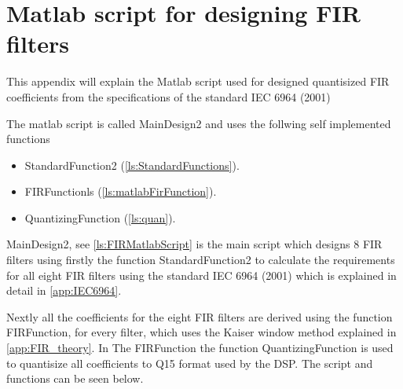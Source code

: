 \chapter{Matlab script for designing FIR filters} \label{app:FIR_Matlab}
This appendix will explain the Matlab script used for designed quantisized FIR coefficients from the specifications of the standard IEC 6964 (2001) 

The matlab script is called MainDesign2 and uses the follwing self implemented functions
\begin{itemize}
\item StandardFunction2 (\autoref{ls:StandardFunctions}).
\item FIRFunctionls (\autoref{ls:matlabFirFunction}).
\item QuantizingFunction (\autoref{ls:quan}).
\end{itemize}
MainDesign2, see \autoref{ls:FIRMatlabScript} is the main script which designs 8 FIR filters using firstly the function StandardFunction2 to calculate the requirements for all eight FIR filters using the standard IEC 6964 (2001) which is explained in detail in \autoref{app:IEC6964}.

Nextly all the coefficients for the eight FIR filters are derived using the function FIRFunction, for every filter, which uses the Kaiser window method explained in \autoref{app:FIR_theory}. In The FIRFunction the function QuantizingFunction is used to quantisize all coefficients to Q15 format used by the DSP. The script and functions can be seen below. 

